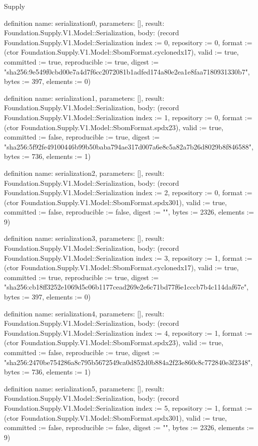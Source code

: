 \begin{lexlean}{Supply}
\begin{semanticmodule}
definition{
  name: serialization0,
  parameters: [],
  result: Foundation.Supply.V1.Model::Serialization,
  body: (record Foundation.Supply.V1.Model::Serialization {index := 0, repository := 0, format := (ctor Foundation.Supply.V1.Model::SbomFormat.cyclonedx17), valid := true, committed := true, reproducible := true, digest := "sha256:9e549f0cbd00e7a4d7f6cc2072081b1adfed174a80e2ea1e8faa7180931330b7", bytes := 397, elements := 0})
}

definition{
  name: serialization1,
  parameters: [],
  result: Foundation.Supply.V1.Model::Serialization,
  body: (record Foundation.Supply.V1.Model::Serialization {index := 1, repository := 0, format := (ctor Foundation.Supply.V1.Model::SbomFormat.spdx23), valid := true, committed := false, reproducible := true, digest := "sha256:5f92fe49100446b99b50baba794ae317d007a6e8c5a82a7b26d8029b8f846588", bytes := 736, elements := 1})
}

definition{
  name: serialization2,
  parameters: [],
  result: Foundation.Supply.V1.Model::Serialization,
  body: (record Foundation.Supply.V1.Model::Serialization {index := 2, repository := 0, format := (ctor Foundation.Supply.V1.Model::SbomFormat.spdx301), valid := true, committed := false, reproducible := false, digest := "", bytes := 2326, elements := 9})
}

definition{
  name: serialization3,
  parameters: [],
  result: Foundation.Supply.V1.Model::Serialization,
  body: (record Foundation.Supply.V1.Model::Serialization {index := 3, repository := 1, format := (ctor Foundation.Supply.V1.Model::SbomFormat.cyclonedx17), valid := true, committed := true, reproducible := true, digest := "sha256:cb18ff3252e1069d5c06b1177cead269e2e6c71bd77f6e1cccb7b4c114daf67e", bytes := 397, elements := 0})
}

definition{
  name: serialization4,
  parameters: [],
  result: Foundation.Supply.V1.Model::Serialization,
  body: (record Foundation.Supply.V1.Model::Serialization {index := 4, repository := 1, format := (ctor Foundation.Supply.V1.Model::SbomFormat.spdx23), valid := true, committed := false, reproducible := true, digest := "sha256:2470be754286a8c795b5672549ca0d852d0b884a2f23e860c8c772840e3f2348", bytes := 736, elements := 1})
}

definition{
  name: serialization5,
  parameters: [],
  result: Foundation.Supply.V1.Model::Serialization,
  body: (record Foundation.Supply.V1.Model::Serialization {index := 5, repository := 1, format := (ctor Foundation.Supply.V1.Model::SbomFormat.spdx301), valid := true, committed := false, reproducible := false, digest := "", bytes := 2326, elements := 9})
}


\end{semanticmodule}
\end{lexlean}
